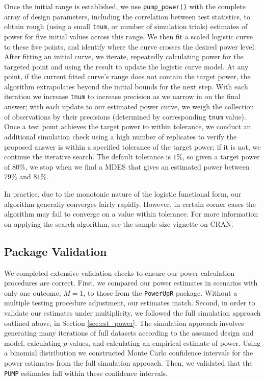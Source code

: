 \documentclass[
]{article}
\begin{document}
Once the initial range is established, we use \texttt{pump\_power()}
with the complete array of design parameters, including the correlation
between test statistics, to obtain rough (using a small \texttt{tnum},
or number of simulation trials) estimates of power for five initial
values across this range. We then fit a scaled logistic curve to these
five points, and identify where the curve crosses the desired power
level. After fitting an initial curve, we iterate, repeatedly
calculating power for the targeted point and using the result to update
the logistic curve model. At any point, if the current fitted curve's
range does not contain the target power, the algorithm extrapolates
beyond the initial bounds for the next step. With each iteration we
increase \texttt{tnum} to increase precision as we narrow in on the
final answer; with each update to our estimated power curve, we weigh
the collection of observations by their precisions (determined by
corresponding \texttt{tnum} value). Once a test point achieves the
target power to within tolerance, we conduct an additional simulation
check using a high number of replicates to verify the proposed answer is
within a specified tolerance of the target power; if it is not, we
continue the iterative search. The default tolerance is \(1\%\), so
given a target power of \(80\%\), we stop when we find a MDES that gives
an estimated power between \(79\%\) and \(81\%\).

In practice, due to the monotonic nature of the logistic functional
form, our algorithm generally converges fairly rapidly. However, in
certain corner cases the algorithm may fail to converge on a value
within tolerance. For more information on applying the search algorithm,
see the sample size vignette on CRAN.

\subsection{Package Validation}

We completed extensive validation checks to ensure our power calculation
procedures are correct. First, we compared our power estimates in
scenarios with only one outcome, \(M = 1\), to those from the
\texttt{PowerUpR} package. Without a multiple testing procedure
adjustment, our estimates match. Second, in order to validate our
estimates under multiplicity, we followed the full simulation approach
outlined above, in Section \ref{sec:est_power}. The simulation approach
involves generating many iterations of full datasets according to the
assumed design and model, calculating \(p\)-values, and calculating an
empirical estimate of power. Using a binomial distribution we
constructed Monte Carlo confidence intervals for the power estimates
from the full simulation approach. Then, we validated that the
\texttt{PUMP} estimates fall within these confidence intervals.
\end{document}

